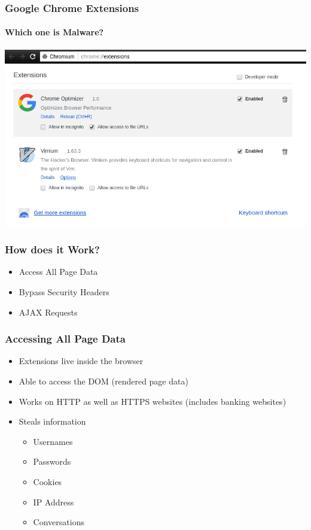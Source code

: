 \documentclass[aspectratio=169]{beamer}
\begin{document}
\begin{frame}
  \frametitle{Google Chrome Extensions}
  \framesubtitle{Which one is Malware?}
  \begin{center}
    \includegraphics[scale=0.3]{extensions}
  \end{center}
\end{frame}

\begin{frame}
  \frametitle{How does it Work?}
  \begin{center}
    \begin{itemize}
    \item Access All Page Data
    \item Bypass Security Headers
    \item AJAX Requests
    \end{itemize}
  \end{center}
\end{frame}

\begin{frame}
  \frametitle{Accessing All Page Data}
  \begin{center}
    \begin{itemize}
    \item Extensions live inside the browser
    \item Able to access the DOM (rendered page data)
    \item Works on HTTP as well as HTTPS websites (includes banking websites)
    \item Steals information
      \begin{itemize}
      \item Usernames
      \item Passwords
      \item Cookies
      \item IP Address
      \item Conversations
      \end{itemize}
    \end{itemize}
  \end{center}
\end{frame}
\end{document}

